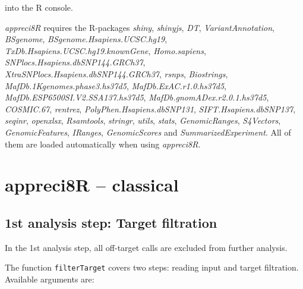 \documentclass{article}
\begin{document}
into the R console.

\emph{appreci8R} requires the R-packages \emph{shiny}, \emph{shinyjs}, \emph{DT}, \emph{VariantAnnotation}, \emph{BSgenome}, \emph{BSgenome.Hsapiens.UCSC.hg19}, \emph{TxDb.Hsapiens.UCSC.hg19.knownGene}, \emph{Homo.sapiens}, \emph{SNPlocs.Hsapiens.dbSNP144.GRCh37}, \emph{XtraSNPlocs.Hsapiens.dbSNP144.GRCh37}, \emph{rsnps}, \emph{Biostrings}, \emph{MafDb.1Kgenomes.phase3.hs37d5}, \emph{MafDb.ExAC.r1.0.hs37d5}, \emph{MafDb.ESP6500SI.V2.SSA137.hs37d5}, \emph{MafDb.gnomADex.r2.0.1.hs37d5}, \emph{COSMIC.67}, \emph{rentrez}, \emph{PolyPhen.Hsapiens.dbSNP131}, \emph{SIFT.Hsapiens.dbSNP137}, \emph{seqinr}, \emph{openxlsx}, \emph{Rsamtools}, \emph{stringr}, \emph{utils}, \emph{stats}, \emph{GenomicRanges}, \emph{S4Vectors}, \emph{GenomicFeatures}, \emph{IRanges}, \emph{GenomicScores} and \emph{SummarizedExperiment}. All of them are loaded automatically when using \emph{appreci8R}.

\section{appreci8R -- classical}
\subsection{1st analysis step: Target filtration}
In the 1st analysis step, all off-target calls are excluded from further analysis.

The function \texttt{filterTarget} covers two steps: reading input and target filtration. Available arguments are:
\end{document}
